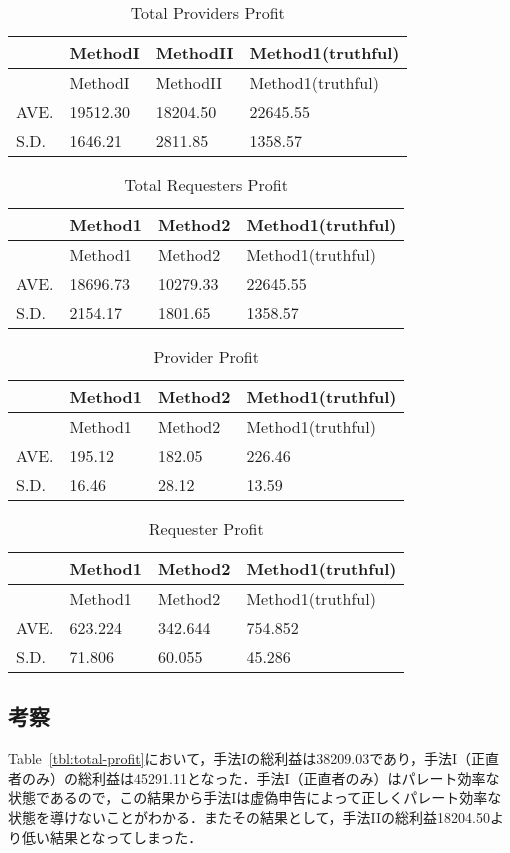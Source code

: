 \hypertarget{tbl:providers-total-profit}{}
\begin{longtable}[H]{@{}llll@{}}
\caption{\label{tbl:providers-total-profit}Total Providers
Profit}\tabularnewline
\toprule
& MethodI & MethodII & Method1(truthful)\tabularnewline
\midrule
\endfirsthead
\toprule
& MethodI & MethodII & Method1(truthful)\tabularnewline
\midrule
\endhead
AVE. & 19512.30 & 18204.50 & 22645.55\tabularnewline
S.D. & 1646.21 & 2811.85 & 1358.57\tabularnewline
\bottomrule
\end{longtable}

\hypertarget{tbl:requesters-total-profit}{}
\begin{longtable}[H]{@{}llll@{}}
\caption{\label{tbl:requesters-total-profit}Total Requesters
Profit}\tabularnewline
\toprule
& Method1 & Method2 & Method1(truthful)\tabularnewline
\midrule
\endfirsthead
\toprule
& Method1 & Method2 & Method1(truthful)\tabularnewline
\midrule
\endhead
AVE. & 18696.73 & 10279.33 & 22645.55\tabularnewline
S.D. & 2154.17 & 1801.65 & 1358.57\tabularnewline
\bottomrule
\end{longtable}

\hypertarget{tbl:provider-total-profit}{}
\begin{longtable}[H]{@{}llll@{}}
\caption{\label{tbl:provider-total-profit}Provider
Profit}\tabularnewline
\toprule
& Method1 & Method2 & Method1(truthful)\tabularnewline
\midrule
\endfirsthead
\toprule
& Method1 & Method2 & Method1(truthful)\tabularnewline
\midrule
\endhead
AVE. & 195.12 & 182.05 & 226.46\tabularnewline
S.D. & 16.46 & 28.12 & 13.59\tabularnewline
\bottomrule
\end{longtable}

\hypertarget{tbl:requester-total-profit}{}
\begin{longtable}[H]{@{}llll@{}}
\caption{\label{tbl:requester-total-profit}Requester
Profit}\tabularnewline
\toprule
& Method1 & Method2 & Method1(truthful)\tabularnewline
\midrule
\endfirsthead
\toprule
& Method1 & Method2 & Method1(truthful)\tabularnewline
\midrule
\endhead
AVE. & 623.224 & 342.644 & 754.852\tabularnewline
S.D. & 71.806 & 60.055 & 45.286\tabularnewline
\bottomrule
\end{longtable}

\hypertarget{ux8003ux5bdf-9}{%
\subsection{考察}\label{ux8003ux5bdf-9}}

Table~\ref{tbl:total-profit}において，手法Iの総利益は38209.03であり，手法I（正直者のみ）の総利益は45291.11となった．手法I（正直者のみ）はパレート効率な状態であるので，この結果から手法Iは虚偽申告によって正しくパレート効率な状態を導けないことがわかる．またその結果として，手法IIの総利益18204.50より低い結果となってしまった．

